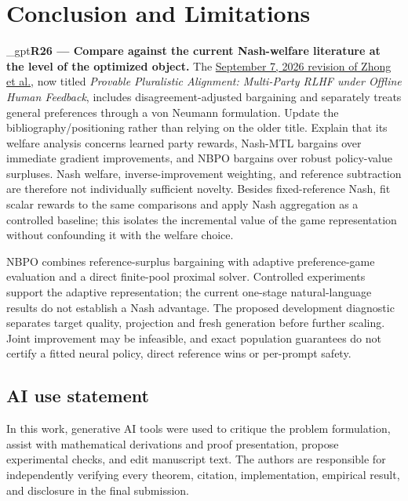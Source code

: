 \documentclass{article}
\newif\ifshowreviews
\newcommand{\reviewresponse}[1]{%
  \ifshowreviews
  \par\begingroup\color{blue!65!black}\hypersetup{allcolors=blue!65!black}\emergencystretch=2em%
  \noindent\textbf{Response:} #1\par\endgroup
  \fi}
\theoremstyle{remark}
\theoremstyle{plain}
\newcommand{\NBPO}{\textsc{NBPO}}
\begin{document}
\section{Conclusion and Limitations}
\label{sec:conclusion}

\kekim_gpt{\textbf{R26 --- Compare against the current Nash-welfare literature at the level of the optimized object.} The \href{https://arxiv.org/abs/2403.05006v2}{September 7, 2026 revision of Zhong et al.}, now titled \emph{Provable Pluralistic Alignment: Multi-Party RLHF under Offline Human Feedback}, includes disagreement-adjusted bargaining and separately treats general preferences through a von Neumann formulation. Update the bibliography/positioning rather than relying on the older title. Explain that its welfare analysis concerns learned party rewards, Nash-MTL bargains over immediate gradient improvements, and NBPO bargains over robust policy-value surpluses. Nash welfare, inverse-improvement weighting, and reference subtraction are therefore not individually sufficient novelty. Besides fixed-reference Nash, fit scalar rewards to the same comparisons and apply Nash aggregation as a controlled baseline; this isolates the incremental value of the game representation without confounding it with the welfare choice.}
\reviewresponse{\textbf{R26 --- Partially addressed.} Related Work distinguishes Nash welfare over learned rewards, von Neumann solutions, gradient bargaining and robust policy-value surpluses. Controlled and UF BT-RM--Nash comparisons are present. These observations do not establish a representation advantage on natural feedback.}

\NBPO{} combines reference-surplus bargaining with adaptive preference-game evaluation and a direct finite-pool proximal solver. Controlled experiments support the adaptive representation; the current one-stage natural-language results do not establish a Nash advantage. The proposed development diagnostic separates target quality, projection and fresh generation before further scaling. Joint improvement may be infeasible, and exact population guarantees do not certify a fitted neural policy, direct reference wins or per-prompt safety.

\subsection*{AI use statement}
In this work, generative AI tools were used to critique the problem formulation, assist with mathematical derivations and proof presentation, propose experimental checks, and edit manuscript text. The authors are responsible for independently verifying every theorem, citation, implementation, empirical result, and disclosure in the final submission.
\end{document}

